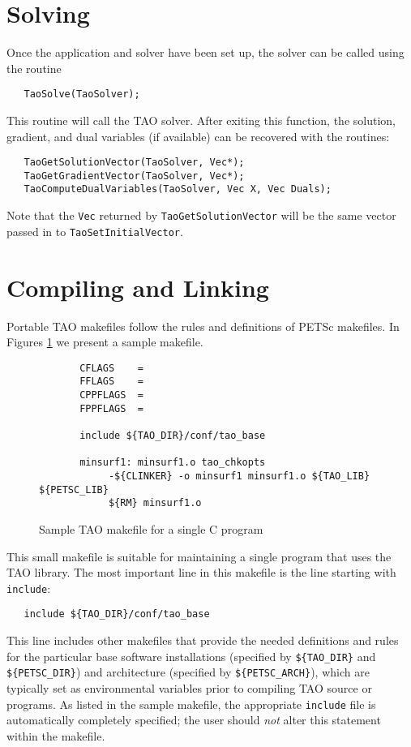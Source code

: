 \section{Solving}
Once the application and solver have been set up, the solver can be called using the routine
\begin{verbatim}
   TaoSolve(TaoSolver);
\end{verbatim}
\noindent
This  routine will call the TAO solver. 
After exiting this function, the solution, gradient, and dual variables (if
available) can be
recovered with the routines:
\begin{verbatim}
   TaoGetSolutionVector(TaoSolver, Vec*);
   TaoGetGradientVector(TaoSolver, Vec*);
   TaoComputeDualVariables(TaoSolver, Vec X, Vec Duals);
\end{verbatim}
\noindent
Note that the {\tt Vec} returned by {\tt TaoGetSolutionVector} will be
the same vector passed in to {\tt TaoSetInitialVector}.



\section{Compiling and Linking}

Portable TAO makefiles follow the rules and definitions
of PETSc makefiles.
In Figures \ref{fig:make3} we present a sample makefile.

\begin{figure}[tbh]
{\footnotesize
\begin{verbatim}   
       CFLAGS    = 
       FFLAGS    = 
       CPPFLAGS  =
       FPPFLAGS  =
       
       include ${TAO_DIR}/conf/tao_base
   
       minsurf1: minsurf1.o tao_chkopts
            -${CLINKER} -o minsurf1 minsurf1.o ${TAO_LIB} ${PETSC_LIB}
            ${RM} minsurf1.o
\end{verbatim} 
\noindent
}
\caption{Sample TAO makefile for a single C program}
\label{fig:make3}
\end{figure}

This small makefile is suitable for maintaining a single program that
uses the TAO library.  The most important line in this makefile is the
line starting with {\tt include}:

\begin{verbatim}
   include ${TAO_DIR}/conf/tao_base
\end{verbatim}
\noindent %
This line includes other makefiles that provide the needed definitions
and rules for the particular base software installations (specified by
{\tt \$\{TAO\_DIR\}} and {\tt \$\{PETSC\_DIR\}}) and architecture
(specified by {\tt \$\{PETSC\_ARCH\}}), which are typically set as
environmental variables prior to compiling TAO source or programs.  As
listed in the sample makefile, the appropriate {\tt include} file is
automatically completely specified; the user should {\em not} alter
this statement within the makefile.
 
